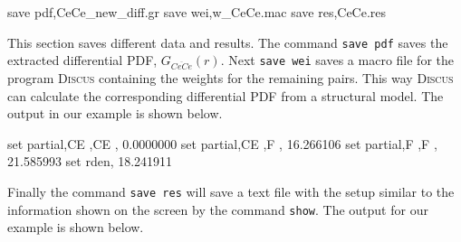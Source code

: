 \begin{MacVerbatim}  
 save pdf,CeCe_new_diff.gr
 save wei,w_CeCe.mac
 save res,CeCe.res
\end{MacVerbatim}

This section saves different data and results. The command {\tt save pdf} saves 
the extracted differential PDF, $G_{\overline{CeCe}}(r)$. Next {\tt save wei} 
saves a macro file for the program \textsc{Discus} containing the weights for 
the remaining pairs. This way \textsc{Discus} can calculate the corresponding 
differential PDF from a structural model. The output in our example is shown 
below.

\begin{MacVerbatim}  
 set partial,CE  ,CE  ,       0.0000000    
 set partial,CE  ,F   ,       16.266106    
 set partial,F   ,F   ,       21.585993    
 set rden,       18.241911 
\end{MacVerbatim}

Finally the command {\tt save res} will save a text file with the setup similar 
to the information shown on the screen by the command {\tt show}. The output for 
our example is shown below.


